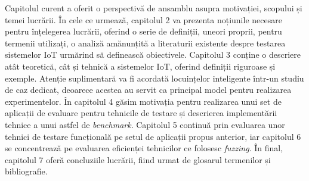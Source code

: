 Capitolul curent a oferit o perspectivă de ansamblu asupra motivației, scopului și temei lucrării. În cele ce urmează, capitolul 2 va prezenta noțiunile necesare pentru înțelegerea lucrării, oferind o serie de definiții, uneori proprii, pentru termenii utilizați, o analiză amănunțită a literaturii existente despre testarea sistemelor IoT urmărind să definească obiectivele. Capitolul 3 conține o descriere atât teoretică, cât și tehnică a sistemelor IoT, oferind definiții riguroase și exemple. Atenție suplimentară va fi acordată locuințelor inteligente într-un studiu de caz dedicat, deoarece acestea au servit ca principal model pentru realizarea experimentelor. În capitolul 4 găsim motivația pentru realizarea unui set de aplicații de evaluare pentru tehnicile de testare și descrierea implementării tehnice a unui astfel de \textit{benchmark}. Capitolul 5 continuă prin evaluarea unor tehnici de testare funcțională pe setul de aplicații propus anterior, iar capitolul 6 se concentrează pe evaluarea eficienței tehnicilor ce folosesc \textit{fuzzing}. În final, capitolul 7 oferă concluziile lucrării, fiind urmat de glosarul termenilor și bibliografie.